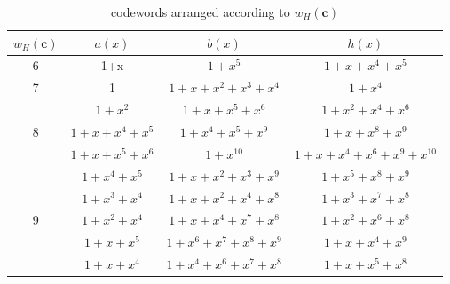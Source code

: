 \documentclass[11pt, oneside, dvipdfmx]{book}
\begin{document}
 \begin{table*}[h]
 
 \caption{codewords arranged according to $w_H(\textbf{c})$}
\centering
\begin{tabularx}{\linewidth}{c c c c}

 \hline
 $w_H(\textbf{c})$ & $a(x)$ & $b(x)$ & $h(x)$ \\ [0.5ex] 
 \hline\hline
 6 & 1+x & $1+x^5$ & $1+x+x^4+x^5$\\ 
 \hline\hline
 7 & 1 & $1+x+x^2+x^3+x^4$ & $1+x^4$\\ 
 \hline\hline
  & $1+x^2$ & $1+x+x^5+x^6$ & $1+x^2+x^4+x^6$ \\

 8 & $1+x+x^4+x^5$& $1+x^4+x^5+x^9$ & $1+x+x^8+x^{9}$ \\
 
  & $1+x+x^5+x^6$& $1+x^{10}$ & $1+x+x^4+x^6+x^{9}+x^{10}$ \\
 \hline\hline
 & $1+x^4+x^5$ & $1+x+x^2+x^3+x^{9}$& $1+x^5+x^8+x^{9}$ \\

 & $1+x^3+x^4$ & $1+x+x^2+x^4+x^8$ & $1+x^3+x^7+x^{8}$ \\
 
9 & $1+x^2+x^4$ & $1+x+x^4+x^7+x^8$ & $1+x^2+x^6+x^{8}$\\ 
 
 & $1+x+x^5$ & $1+x^6+x^7+x^8+x^9$ & $1+x+x^4+x^{9}$ \\ 
 
 & $1+x+x^4$ & $1+x^4+x^6+x^7+x^8$ & $1+x+x^5+x^{8}$ \\ 
\hline
 
 
 \end{tabularx}
 \label{tab1}
\end{table*}
\end{document}

